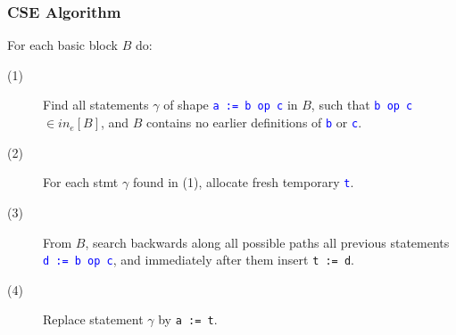 \documentclass{beamer}
\newcommand{\blue}[1]{\textcolor{Blue}{{#1}}}
\renewcommand{\emph}[1]{\textcolor{structure}{#1}}
\newcommand{\emp}[1]{\textcolor{DikuRed}{ #1}}
\begin{document}
\begin{frame}[fragile,t]
    \frametitle{CSE Algorithm}

\bigskip

For each basic block $B$ do:

\bigskip

\begin{description}

    \item[(1)] Find all statements $\gamma$ of shape \blue{\tt a := b op c} 
                    in $B$, such that \blue{\tt b op c} $\in in_e[B]$, and $B$ 
                    contains no earlier definitions of \blue{\tt b} or \blue{\tt c}.\bigskip

    \item[(2)] For each stmt $\gamma$ found in \emph{(1)}, allocate fresh temporary \blue{\tt t}.\bigskip

    \item[(3)] From $B$, search backwards along all possible paths all
                    previous statements \blue{\tt d := b op c}, and immediately
                    after them insert \emp{\tt t := d}.\bigskip

    \item[(4)] Replace statement $\gamma$ by \emp{\tt a := t}.

\end{description}

\end{frame}
\end{document}
